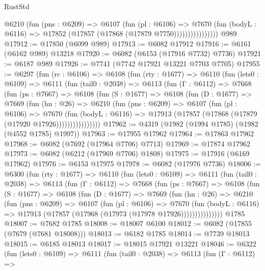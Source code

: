 \begin{lexlean}{RustStd}
\begin{coremodule}
                      @6210
                        (fun (pns : @6209) =>
                        @6107
                          (fun (pl : @6106) =>
                          @7670
                            (fun (bodyL : @6116) =>
                            @17852 (@17857 (@17868 (@17879 @7750))))))))))))))))
    @989
@17912 := @17850 (@6099 @989)
@17913 := @6082 @17912
@17916 := @6161 (@6162 @989) @13218
@17920 := @6082 (@6153 (@17916 @7732) @7736)
@17921 := @6187 @989
@17926 := @7741 (@7742 @17921 @13221 @7703 @7705)
@17955 := @6297
    (fun (rc : @6106) =>
    @6108
      (fun (rty : @1677) =>
      @6110
        (fun (lets0 : @6109) =>
        @6111
          (fun (tail0 : @2038) =>
          @6113
            (fun (Γ : @6112) =>
            @7668
              (fun (ps : @7667) =>
              @6108
                (fun (S : @1677) =>
                @6108
                  (fun (D : @1677) =>
                  @7669
                    (fun (hn : @26) =>
                    @6210
                      (fun (pns : @6209) =>
                      @6107
                        (fun (pl : @6106) =>
                        @7670
                          (fun (bodyL : @6116) =>
                          @17913 (@17857 (@17868 (@17879 (@17920 @17926))))))))))))))))
@17962 := @4319 (@1982 (@1994 @1785) (@1982 (@4552 @1785) @1997))
@17963 := @17955 @17962
@17964 := @17863 @17962
@17968 := @6082 (@7692 (@17964 @7706) @7713)
@17969 := @17874 @17962
@17973 := @6082 (@6212 (@17969 @7706) @1808)
@17975 := @17916 (@6169 @17962)
@17976 := @6153 @17975
@17978 := @6082 (@17976 @7736)
@18006 := @6300
    (fun (rty : @1677) =>
    @6110
      (fun (lets0 : @6109) =>
      @6111
        (fun (tail0 : @2038) =>
        @6113
          (fun (Γ : @6112) =>
          @7668
            (fun (ps : @7667) =>
            @6108
              (fun (S : @1677) =>
              @6108
                (fun (D : @1677) =>
                @7669
                  (fun (hn : @26) =>
                  @6210
                    (fun (pns : @6209) =>
                    @6107
                      (fun (pl : @6106) =>
                      @7670
                        (fun (bodyL : @6116) =>
                        @17913 (@17857 (@17968 (@17973 (@17978 @17926)))))))))))))))
    @1785
@18007 := @7682 @1785
@18008 := @18007 @6100
@18012 := @6082 (@17855 (@7679 (@7681 @18008)))
@18013 := @6182 @1785
@18014 := @7739 @18013
@18015 := @6185 @18013
@18017 := @18015 @17921 @13221
@18046 := @6322
    (fun (lets0 : @6109) =>
    @6111
      (fun (tail0 : @2038) =>
      @6113
        (fun (Γ : @6112) =>

\end{coremodule}
\end{lexlean}
